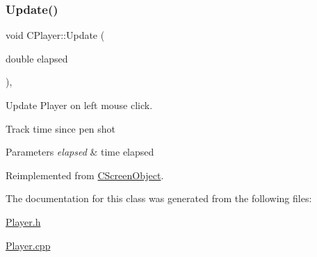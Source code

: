 \subsubsection{\texorpdfstring{Update()}{Update()}}
{\footnotesize\ttfamily void C\+Player\+::\+Update (\begin{DoxyParamCaption}\item[{double}]{elapsed }\end{DoxyParamCaption})\hspace{0.3cm}{\ttfamily [override]}, {\ttfamily [virtual]}}



Update Player on left mouse click. 

Track time since pen shot 
\begin{DoxyParams}{Parameters}
{\em elapsed} & time elapsed \\
\hline
\end{DoxyParams}


Reimplemented from \mbox{\hyperlink{class_c_screen_object_ab682c1e08f001e666f0cec280e1e9eaa}{C\+Screen\+Object}}.



The documentation for this class was generated from the following files\+:\begin{DoxyCompactItemize}
\item 
\mbox{\hyperlink{_player_8h}{Player.\+h}}\item 
\mbox{\hyperlink{_player_8cpp}{Player.\+cpp}}\end{DoxyCompactItemize}
